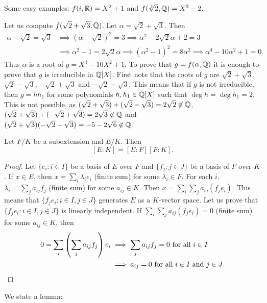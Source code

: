 Some easy examples: $f(i,\mathbb{R})=X^2+1$ and 
$f(\sqrt[3]{2},\mathbb{Q})=X^3-2$. 

\begin{example}
	Let us compute 
	$f(\sqrt{2}+\sqrt{3},\mathbb{Q})$. Let $\alpha=\sqrt{2}+\sqrt{3}$. 
	Then 
	\begin{align*}
		\alpha-\sqrt{2}=\sqrt{3} & \implies 
		(\alpha-\sqrt{2})^2=3 \implies \alpha^2-2\sqrt{2}\alpha+2=3\\
		&\implies \alpha^2-1=2\sqrt{2}\alpha \implies
		(\alpha^2-1)^2=8\alpha^2\implies
		\alpha^4-10\alpha^2+1=0.
	\end{align*}
	Thus $\alpha$ is a root of $g=X^4-10X^2+1$. To prove that $g=f(\alpha,\mathbb{Q})$ 
	it is enough to prove that 
	$g$ is irreducible in $\mathbb{Q}[X]$. First note that 
	the roots
	of $g$ are $\sqrt{2}+\sqrt{3}$, $\sqrt{2}-\sqrt{3}$, 
	$-\sqrt{2}+\sqrt{3}$ and $-\sqrt{2}-\sqrt{3}$. This means that
	if $g$ is not irreducible, 
	then $g=hh_1$ for some polynomials $h,h_1\in\mathbb{Q}[X]$ such that
	$\deg h=\deg h_1=2$. This is not possible, as 
	$(\sqrt{2}+\sqrt{3})+(\sqrt{2}-\sqrt{3})=2\sqrt{2}\not\in\mathbb{Q}$, 
	$(\sqrt{2}+\sqrt{3})+(-\sqrt{2}+\sqrt{3})=2\sqrt{3}\not\in\mathbb{Q}$ and 
	$(\sqrt{2}+\sqrt{3})(-\sqrt{2}-\sqrt{3})=-5-2\sqrt{6}\not\in\mathbb{Q}$.
\end{example}

\begin{proposition}
	Let $F/K$ be a subextension and $E/K$. Then
	\[
	[E:K]=[E:F][F:K].
	\]
\end{proposition}

\begin{proof}
	Let $\{e_i:i\in I\}$ be a basis of $E$ over $F$
	and $\{f_j:j\in J\}$ be a basis of $F$ over $K$. If $x\in E$,
	then $x=\sum_i \lambda_ie_i$ (finite sum) 
	for some $\lambda_i\in F$. For each $i$, 
	$\lambda_i=\sum_j a_{ij}f_j$ (finite sum)
	for some $a_{ij}\in K$. Then 
	$x=\sum_i\sum_j a_{ij}(f_je_i)$. This means
	that $\{f_je_i:i\in I,j\in J\}$ generates
	$E$ as a $K$-vector space. Let us prove that 
	$\{f_je_i:i\in I,j\in J\}$
	is linearly independent. If $\sum_i\sum_j a_{ij}(f_je_i)=0$ (finite sum)
	for some $a_{ij}\in K$, 
	then
	\begin{align*}
		0=\sum_i\left(\sum_j a_{ij}f_j\right)e_i&\implies
		\sum_j a_{ij}f_j=0\text{ for all $i\in I$}\\
		&\implies 
		a_{ij}=0\text{ for all $i\in I$ and $j\in J$}.\qedhere
	\end{align*}
\end{proof}

We state a lemma:

